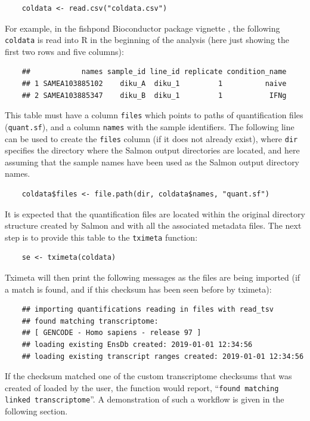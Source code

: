 \documentclass[12pt]{article} \usepackage[utf8]{inputenc}
\begin{document}
\begin{verbatim}
    coldata <- read.csv("coldata.csv")
\end{verbatim}

For example, in the fishpond Bioconductor package vignette \citep{swish}, the
following \texttt{coldata} is read into R in the beginning of the
analysis (here just showing the first two rows and five columns):

\begin{verbatim}
    ##            names sample_id line_id replicate condition_name
    ## 1 SAMEA103885102    diku_A  diku_1         1          naive
    ## 2 SAMEA103885347    diku_B  diku_1         1           IFNg
\end{verbatim}

This table must have a column \texttt{files} which points to paths of
quantification files (\texttt{quant.sf}), and a column \texttt{names} with the sample
identifiers. The following line can be used to create the
\texttt{files} column (if it does not already exist), where \texttt{dir}
specifies the directory where the Salmon output directories are
located, and here assuming that the sample names have been used as the
Salmon output directory names. 

\begin{verbatim}
    coldata$files <- file.path(dir, coldata$names, "quant.sf")
\end{verbatim}

It is expected that the quantification files are located
within the original directory structure created by Salmon and with all
the associated metadata files. The next
step is to provide this table to the \texttt{tximeta} function:

\begin{verbatim}
    se <- tximeta(coldata)
\end{verbatim}

Tximeta will then print the following messages as the files are being
imported (if a match is found, and if this checksum has been seen
before by tximeta):

\begin{verbatim}
    ## importing quantifications reading in files with read_tsv 
    ## found matching transcriptome: 
    ## [ GENCODE - Homo sapiens - release 97 ]
    ## loading existing EnsDb created: 2019-01-01 12:34:56 
    ## loading existing transcript ranges created: 2019-01-01 12:34:56
\end{verbatim}

If the checksum matched one of the custom transcriptome checksums that
was created of loaded by the user, the function would report,
``\texttt{found matching linked transcriptome}''. A demonstration of
such a workflow is given in the following section.
\end{document}
